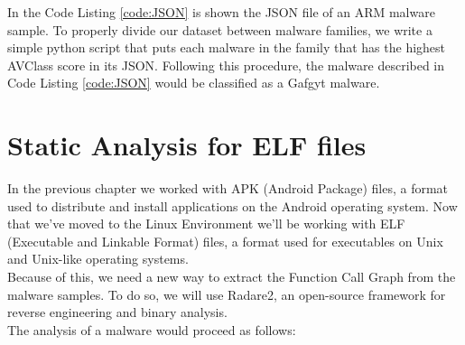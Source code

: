 \pagebreak 

\noindent In the Code Listing \ref{code:JSON} is shown the JSON file of an ARM malware sample. To properly divide our dataset between malware families, we write a simple python script that puts each malware in the family that has the highest AVClass score in its JSON. Following this procedure, the malware described in Code Listing \ref{code:JSON} would be classified as a Gafgyt malware.

\section{Static Analysis for ELF files}
In the previous chapter we worked with APK (Android Package) files, a format used to distribute and install applications on the Android operating system. Now that we've moved to the Linux Environment we'll be working with ELF (Executable and Linkable Format) files, a format used for executables on Unix and Unix-like operating systems. \\
Because of this, we need a new way to extract the Function Call Graph from the malware samples. To do so, we will use Radare2, an open-source framework for reverse engineering and binary analysis. \\
The analysis of a malware would proceed as follows:

